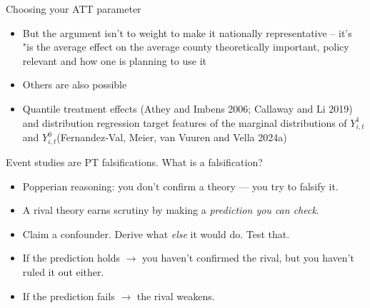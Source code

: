 \documentclass[aspectratio=169,11pt]{beamer}
\begin{document}
\begin{frame}{Choosing your ATT parameter}

\begin{itemize}
\item But the argument isn't to weight to make it nationally representative -- it's "is the average effect on the average county theoretically important, policy relevant and how one is planning to use it
\item Others are also possible
\item Quantile treatment effects (Athey and Imbens 2006; Callaway and Li 2019) and distribution regression target features of the marginal distributions of $Y^1_{i,t}$ and $Y^0_{i,t}$(Fernandez-Val, Meier, van Vuuren and Vella 2024a)
\end{itemize}

\end{frame}


\begin{frame}{Event studies are PT falsifications. What is a falsification?}
\vspace{0.6em}
\begin{itemize}\setlength\itemsep{0.5em}
  \item Popperian reasoning: \;you don't confirm a theory --- you try to falsify it.
  \item A rival theory earns scrutiny by making a \textit{prediction you can check}.
  \item Claim a confounder. Derive what \textit{else} it would do. Test that.
  \item If the prediction holds $\to$ you haven't confirmed the rival, but you haven't ruled it out either.
  \item If the prediction fails $\to$ the rival weakens.
\end{itemize}
\vspace{0.5em}
\end{frame}
\end{document}
